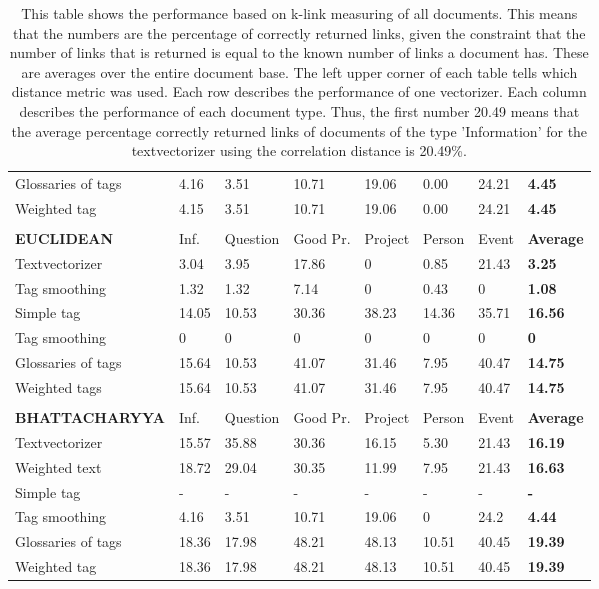 \begin{table}
\begin{tabular}{| l | l | l | l | l | l | l | l |}
Glossaries of tags & 4.16 & 3.51 & 10.71 & 19.06 & 0.00 & 24.21 & {\bf 4.45} \\ 
Weighted tag & 4.15 & 3.51 & 10.71 & 19.06 & 0.00 & 24.21 & {\bf 4.45} \\ 
\hline
\\
\hline
{\bf EUCLIDEAN} & Inf. &  Question &  Good Pr.& Project & Person &  Event & {\bf Average} \\
\hline
Textvectorizer & 3.04 & 3.95 & 17.86 & 0 & 0.85 & 21.43 & {\bf 3.25} \\ 
Tag smoothing & 1.32 & 1.32 & 7.14 & 0 & 0.43 & 0 & {\bf 1.08} \\ 
Simple tag & 14.05 & 10.53  & 30.36 & 38.23 & 14.36 & 35.71 & {\bf 16.56} \\ 
Tag smoothing & 0 & 0 & 0 & 0 & 0 & 0 & {\bf 0} \\ 
Glossaries of tags & 15.64 & 10.53 & 41.07 & 31.46 & 7.95 & 40.47 & {\bf 14.75} \\ 
Weighted tags & 15.64 & 10.53 & 41.07 & 31.46 & 7.95 & 40.47 & {\bf 14.75} \\ 
\hline
\\
\hline
{\bf BHATTACHARYYA} & Inf. &  Question &  Good Pr.& Project & Person &  Event & {\bf Average} \\
\hline
Textvectorizer & 15.57 & 35.88 & 30.36 & 16.15 & 5.30 & 21.43 & {\bf 16.19} \\ 
Weighted text & 18.72 & 29.04 & 30.35 & 11.99 & 7.95 & 21.43 & {\bf 16.63} \\ 
Simple tag & - & - & - & - & - & - & {\bf -} \\ 
Tag smoothing & 4.16 & 3.51 & 10.71 & 19.06 & 0 & 24.2 & {\bf 4.44} \\ 
Glossaries of tags & 18.36 & 17.98 & 48.21 & 48.13 & 10.51 & 40.45 & {\bf 19.39} \\ 
Weighted tag & 18.36 & 17.98 & 48.21 & 48.13 & 10.51 & 40.45 & {\bf 19.39} \\ 
\hline
\end{tabular}

\caption{This table shows the performance based on k-link measuring of all documents. This means that the numbers are the percentage of correctly returned links, given the constraint that the number of links that is returned is equal to the known number of links a document has. These are averages over the entire document base. The left upper corner of each table tells which distance metric was used. Each row describes the performance of one vectorizer. Each column describes the performance of each document type. Thus, the first number 20.49 means that the average percentage correctly returned links of documents of the type 'Information' for the textvectorizer using the correlation distance is 20.49\%.}
\label{klink}
\end{table}

